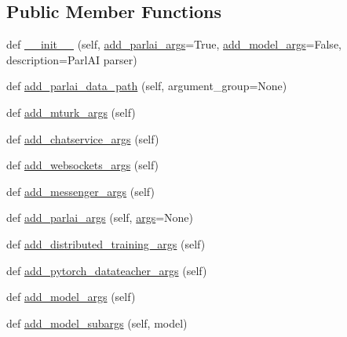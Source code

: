 \subsection*{Public Member Functions}
\begin{DoxyCompactItemize}
\item 
def \hyperlink{classparlai_1_1core_1_1params_1_1ParlaiParser_ab1d55b343c804984783548bec009a695}{\+\_\+\+\_\+init\+\_\+\+\_\+} (self, \hyperlink{classparlai_1_1core_1_1params_1_1ParlaiParser_a3dfaa7781346d8c974d60684e81cb705}{add\+\_\+parlai\+\_\+args}=True, \hyperlink{classparlai_1_1core_1_1params_1_1ParlaiParser_af05d40e27abb0740948fdccfde5b8808}{add\+\_\+model\+\_\+args}=False, description=\textquotesingle{}Parl\+AI parser\textquotesingle{})
\item 
def \hyperlink{classparlai_1_1core_1_1params_1_1ParlaiParser_a896033a34a5e5e1bbc081d99e9835d6b}{add\+\_\+parlai\+\_\+data\+\_\+path} (self, argument\+\_\+group=None)
\item 
def \hyperlink{classparlai_1_1core_1_1params_1_1ParlaiParser_a6043b5b5c36f99f85a9791dd8dc35551}{add\+\_\+mturk\+\_\+args} (self)
\item 
def \hyperlink{classparlai_1_1core_1_1params_1_1ParlaiParser_a63d7f06b4e1222783cb5864cf9a7e782}{add\+\_\+chatservice\+\_\+args} (self)
\item 
def \hyperlink{classparlai_1_1core_1_1params_1_1ParlaiParser_a72da297485838e9633cb0fc86d177cf8}{add\+\_\+websockets\+\_\+args} (self)
\item 
def \hyperlink{classparlai_1_1core_1_1params_1_1ParlaiParser_aed38c7346112f11851969224cb25ad1e}{add\+\_\+messenger\+\_\+args} (self)
\item 
def \hyperlink{classparlai_1_1core_1_1params_1_1ParlaiParser_a3dfaa7781346d8c974d60684e81cb705}{add\+\_\+parlai\+\_\+args} (self, \hyperlink{classparlai_1_1core_1_1params_1_1ParlaiParser_a27d35bfa073588bf887cbdbf45c19f39}{args}=None)
\item 
def \hyperlink{classparlai_1_1core_1_1params_1_1ParlaiParser_a718f9802eec8bcac25866900d2ae69b0}{add\+\_\+distributed\+\_\+training\+\_\+args} (self)
\item 
def \hyperlink{classparlai_1_1core_1_1params_1_1ParlaiParser_a037989eca768126b981270b2bdf06b0c}{add\+\_\+pytorch\+\_\+datateacher\+\_\+args} (self)
\item 
def \hyperlink{classparlai_1_1core_1_1params_1_1ParlaiParser_af05d40e27abb0740948fdccfde5b8808}{add\+\_\+model\+\_\+args} (self)
\item 
def \hyperlink{classparlai_1_1core_1_1params_1_1ParlaiParser_a46c57cd479d8780c4c22aecb3135d5fe}{add\+\_\+model\+\_\+subargs} (self, model)

\end{DoxyCompactItemize}
